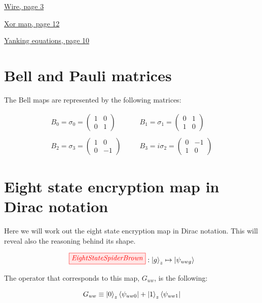 \documentclass[]{article}
\begin{document}
\hyperref[identity]{Wire, page 3}

\hyperref[xorgate]{Xor map, page 12}

\hyperref[section:yankingequations]{Yanking equations, page 10}

\section{Bell and Pauli matrices}
\label{appendix:BellMaps}


The Bell maps are represented by the following matrices:

\begin{equation}
\begin{aligned}
B_0 = \sigma_0 = 
\begin{pmatrix}
1 & 0 \\
0 & 1
\end{pmatrix}  %
~~~~&~~~~ B_1 = \sigma_1 =
\begin{pmatrix}
0 & 1 \\
1 & 0
\end{pmatrix}%
\\\\
B_2 = \sigma_3 =
\begin{pmatrix}
1 & 0 \\
0 & -1
\end{pmatrix}  %
~~~~&~~~~  B_3 = i\sigma_2 =
\begin{pmatrix}
0 & -1 \\
1 & 0
\end{pmatrix}
\end{aligned}
\end{equation}

\section{Eight state encryption map in Dirac notation}
\label{appendix:EightStateEncryptionMapDirac}
Here we will work out the eight state encryption map in Dirac notation. This will reveal also the reasoning behind its shape. 

\begin{equation}
\tikzfig{EightStateSpiderBrown} :
\ket{g}_z \mapsto \ket{\psi_{uwg}}
\end{equation}

The operator that corresponds to this map, $G_{uw}$, is the following:

\begin{equation}
	G_{uw} \equiv \ket{0}_z\bra{\psi_{uw0}} + \ket{1}_z\bra{\psi_{uw1}}
\end{equation}
\end{document}
